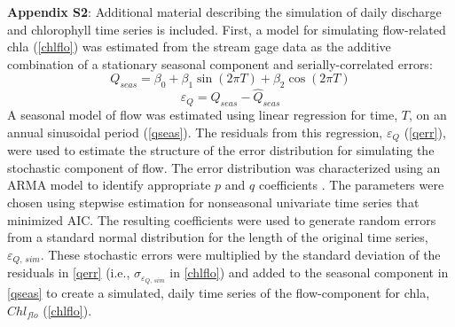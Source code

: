 \documentclass{svjour3}\usepackage[]{graphicx}\usepackage[]{color}
\begin{document}
{\bf Appendix S2}: Additional material describing the simulation of daily discharge and chlorophyll time series is included. 
First, a model for simulating flow-related \ac{chla} (\cref{chlflo}) was estimated from the stream gage data as the additive combination of a stationary seasonal component and serially-correlated errors:
\begin{equation} \label{qseas}
Q_{seas} = \beta_0 + \beta_1 \sin\left(2\pi T\right) + \beta_2 \cos\left(2\pi T\right)
\end{equation}
\begin{equation} \label{qerr}
\varepsilon_{Q} = Q_{seas} - \widehat{Q}_{seas}
\end{equation}
A seasonal model of flow was estimated using linear regression for time, $T$, on an annual sinusoidal period (\cref{qseas}).  The residuals from this regression, $\varepsilon_{Q}$ (\cref{qerr}), were used to estimate the structure of the error distribution for simulating the stochastic component of flow.  The error distribution was characterized using an \ac{ARMA} model to identify appropriate $p$ and $q$ coefficients \cite{Hyndman08}.  The parameters were chosen using stepwise estimation for nonseasonal univariate time series that minimized \ac{AIC}.  The resulting coefficients were used to generate random errors from a standard normal distribution for the length of the original time series, $\varepsilon_{Q,\,sim}$.  These stochastic errors were multiplied by the standard deviation of the residuals in \cref{qerr} (i.e., $\sigma_{\varepsilon_{Q,\,sim}}$ in \cref{chlflo}) and added to the seasonal component in \cref{qseas} to create a simulated, daily time series of the flow-component for \ac{chla}, $Chl_{flo}$ (\cref{chlflo}).
\end{document}
